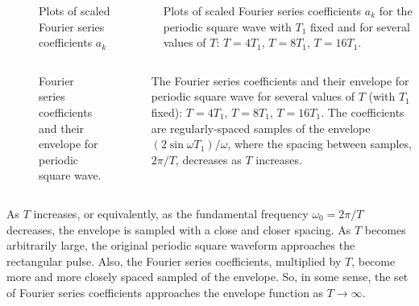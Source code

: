 \begin{frame}[plain,t]
    \begin{columns}
        {
        \begin{figure}
          \centering
          
          \caption{Plots of scaled Fourier series coefficients $a_k$}\label{fi:example02_periodic_square_fs}
        \end{figure}
        }
        {
            \small
            \noindent Plots of scaled Fourier series coefficients $a_k$ for the periodic square wave with $T_1$ fixed and for several values of $T$: $T=4T_1$, $T=8T_1$, $T=16T_1$.

        }
    \end{columns}
\end{frame}


\begin{frame}[plain,t]
    \begin{columns}
        {
        \begin{figure}
          \centering
          
          \caption{Fourier series coefficients and their envelope for periodic square wave.}\label{fi:periodic_square_fs_samples_of_envilope}
        \end{figure}
        }
        {
            \small
            \noindent The Fourier series coefficients and their envelope for periodic square wave for several values of $T$ (with $T_1$ fixed): $T=4T_1$, $T=8T_1$, $T=16T_1$. The coefficients are regularly-spaced samples of the envelope $(2\sin \omega T_1)/\omega$, where the spacing between samples, $2\pi/T$, decreases as $T$ increases.
        }
    \end{columns}
\end{frame}


\begin{frame}
    As $T$ increases, or equivalently, as the fundamental frequency $\omega_0 = 2\pi/T$ decreases, the envelope is sampled with a close and closer spacing. As $T$ becomes arbitrarily large, the original periodic square waveform approaches the rectangular pulse. Also, the Fourier series coefficients, multiplied by $T$, become more and more closely spaced sampled of the envelope. So, in some sense, the set of Fourier series coefficients  approaches the envelope function as $T\rightarrow \infty$.
\end{frame}


